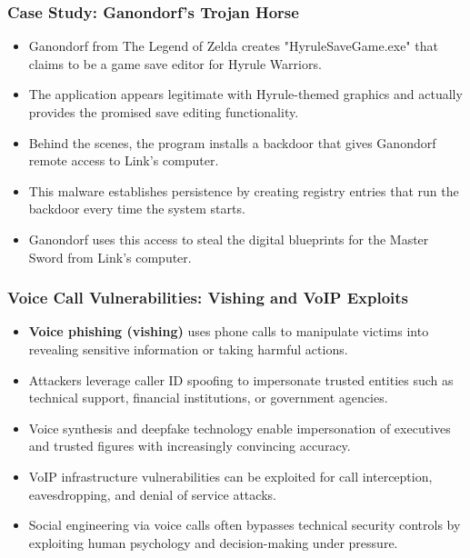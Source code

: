 \documentclass{beamer}
\begin{document}
\begin{frame}
    \frametitle{Case Study: Ganondorf's Trojan Horse}
    
    \begin{itemize}
        \item Ganondorf from The Legend of Zelda creates "HyruleSaveGame.exe" that claims to be a game save editor for Hyrule Warriors.
        \item The application appears legitimate with Hyrule-themed graphics and actually provides the promised save editing functionality.
        \item Behind the scenes, the program installs a backdoor that gives Ganondorf remote access to Link's computer.
        \item This malware establishes persistence by creating registry entries that run the backdoor every time the system starts.
        \item Ganondorf uses this access to steal the digital blueprints for the Master Sword from Link's computer.
    \end{itemize}
\end{frame}

\begin{frame}
    \frametitle{Voice Call Vulnerabilities: Vishing and VoIP Exploits}
    
    \begin{itemize}
        \item \textbf{Voice phishing (vishing)} uses phone calls to manipulate victims into revealing sensitive information or taking harmful actions.
        \item Attackers leverage caller ID spoofing to impersonate trusted entities such as technical support, financial institutions, or government agencies.
        \item Voice synthesis and deepfake technology enable impersonation of executives and trusted figures with increasingly convincing accuracy.
        \item VoIP infrastructure vulnerabilities can be exploited for call interception, eavesdropping, and denial of service attacks.
        \item Social engineering via voice calls often bypasses technical security controls by exploiting human psychology and decision-making under pressure.
    \end{itemize}
\end{frame}
\end{document}
